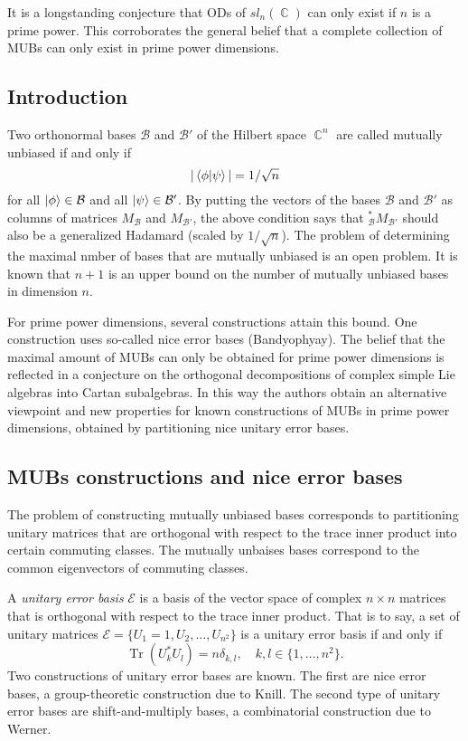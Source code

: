 \documentclass[a4paper]{article}
\DeclareMathOperator{\C}{\mathbb{C}}
\DeclareMathOperator{\Tr}{Tr}
\begin{document}
  It is a longstanding conjecture that ODs of $sl_n(\C)$ can
  only exist if $n$ is a prime power. This corroborates the
  general belief that a complete collection of MUBs can only
  exist in prime power dimensions.

  \subsection{Introduction} 

  Two orthonormal bases $\mathcal{B}$ and $\mathcal{B}'$ of
  the Hilbert space $\C^{n}$ are called mutually unbiased if
  and only if
  \[
    |\braket{\phi|\psi}| = 1 / \sqrt{n}
  \] 
  for all $\ket \phi \in \mathcal{B}$ and all $\ket \psi \in
  \mathcal{B}'$. By putting the vectors of the bases
  $\mathcal{B}$ and $\mathcal{B}'$ as columns of matrices
  $M_{\mathcal{B}}$ and $M_{\mathcal{B}'}$, the above
  condition says that $_{\mathcal{B}}^{*}M_{\mathcal{B}'}$ 
  should also be a generalized Hadamard (scaled by $1 /
  \sqrt{n}$). The problem of determining the maximal nmber
  of bases that are mutually unbiased is an open problem. It
  is known that $n+1$ is an upper bound on the number of
  mutually unbiased bases in dimension $n$.

  For prime power dimensions, several constructions attain
  this bound. One construction uses so-called nice error
  bases (Bandyophyay). The belief that the maximal amount of
  MUBs can only be obtained for prime power dimensions is
  reflected in a conjecture on the orthogonal decompositions
  of complex simple Lie algebras into Cartan subalgebras.
  In this way the authors obtain an alternative viewpoint
  and new properties for known constructions of MUBs in
  prime power dimensions, obtained by partitioning nice
  unitary error bases.

  \subsection{MUBs constructions and nice error bases}

  The problem of constructing mutually unbiased bases
  corresponds to partitioning unitary matrices that are
  orthogonal with respect to the trace inner product into
  certain commuting classes. The mutually unbaises bases
  correspond to the common eigenvectors of commuting
  classes.

  A \textit{unitary error basis} $\mathcal{E}$ is a basis of
  the vector space of complex $n \times n$ matrices that is
  orthogonal with respect to the trace inner product. That
  is to say, a set of unitary matrices $\mathcal{E} = \{U_1
  = 1, U_2, \ldots, U_{n^2}\}$ is a unitary error basis if
  and only if
  \[
    \Tr(U_k^{*} U_l) = n \delta_{k,l}, 
    \quad k,l \in \{1,\ldots,n^2\}.
  \] 
  Two constructions of unitary error bases are known. The
  first are nice error bases, a group-theoretic construction
  due to Knill. The second type of unitary error bases are
  shift-and-multiply bases, a combinatorial construction due
  to Werner.
\end{document}
